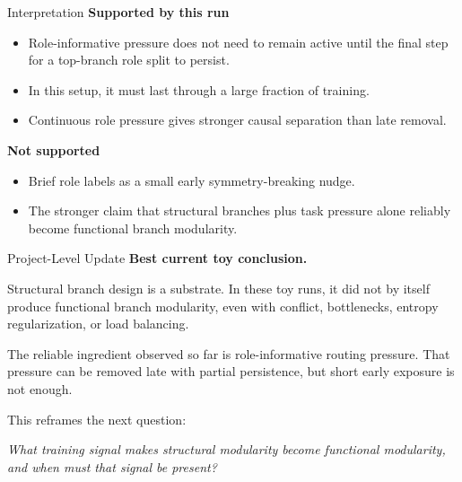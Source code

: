 \documentclass[aspectratio=169]{beamer}
\begin{document}
\begin{frame}{Interpretation}
  \textbf{Supported by this run}
  \begin{itemize}
    \item Role-informative pressure does not need to remain active until the
    final step for a top-branch role split to persist.
    \item In this setup, it must last through a large fraction of training.
    \item Continuous role pressure gives stronger causal separation than late
    removal.
  \end{itemize}

  \vspace{0.8em}
  \textbf{Not supported}
  \begin{itemize}
    \item Brief role labels as a small early symmetry-breaking nudge.
    \item The stronger claim that structural branches plus task pressure alone
    reliably become functional branch modularity.
  \end{itemize}
\end{frame}

\begin{frame}{Project-Level Update}
  \textbf{Best current toy conclusion.}

  \vspace{0.5em}
  Structural branch design is a substrate. In these toy runs, it did not by
  itself produce functional branch modularity, even with conflict, bottlenecks,
  entropy regularization, or load balancing.

  \vspace{0.8em}
  The reliable ingredient observed so far is role-informative routing pressure.
  That pressure can be removed late with partial persistence, but short early
  exposure is not enough.

  \vspace{1em}
  This reframes the next question:
  \begin{center}
  \textit{What training signal makes structural modularity become functional
  modularity, and when must that signal be present?}
  \end{center}
\end{frame}
\end{document}
